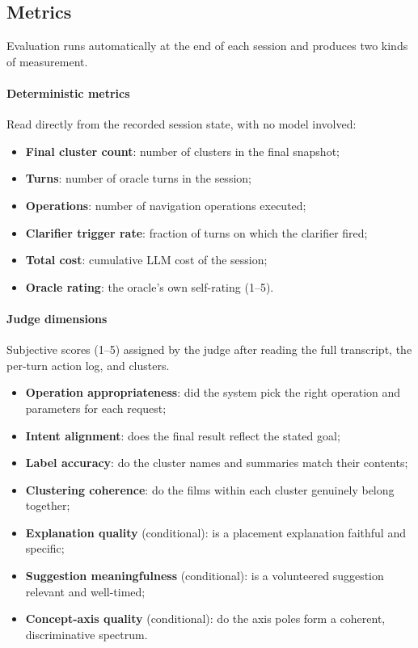 \subsection{Metrics} Evaluation runs automatically at the end of each session and produces two kinds of measurement.

\paragraph{Deterministic metrics} Read directly from the recorded session state, with no model
involved:
\begin{itemize}[leftmargin=1.4em]
  \item \textbf{Final cluster count}: number of clusters in the final snapshot;
  \item \textbf{Turns}: number of oracle turns in the session;
  \item \textbf{Operations}: number of navigation operations executed;
  \item \textbf{Clarifier trigger rate}: fraction of turns on which the clarifier fired;
  \item \textbf{Total cost}: cumulative LLM cost of the session;
  \item \textbf{Oracle rating}: the oracle's own self-rating (1--5).
\end{itemize}

\paragraph{Judge dimensions} Subjective scores (1--5) assigned by the judge after reading the full transcript, the per-turn action log, and clusters.

\begin{itemize}[leftmargin=1.4em]
  \item \textbf{Operation appropriateness}: did the system pick the right operation and parameters for each request;
  \item \textbf{Intent alignment}: does the final result reflect the stated goal;
  \item \textbf{Label accuracy}: do the cluster names and summaries match their contents;
  \item \textbf{Clustering coherence}: do the films within each cluster genuinely belong together;
  \item \textbf{Explanation quality} (conditional): is a placement explanation faithful and specific;
  \item \textbf{Suggestion meaningfulness} (conditional): is a volunteered suggestion relevant and well-timed;
  \item \textbf{Concept-axis quality} (conditional): do the axis poles form a coherent, discriminative spectrum.
\end{itemize}

